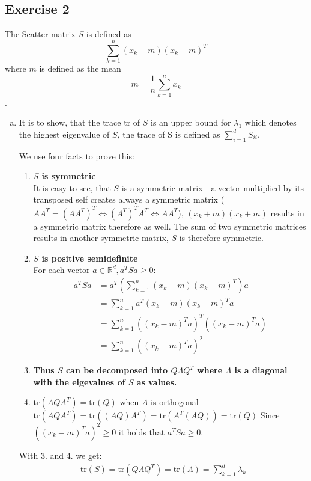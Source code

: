 \documentclass[10pt,a4paper]{article}
\newcommand{\tr}{\text{tr}}
\begin{document}
\subsection*{Exercise 2}
The Scatter-matrix $S$ is defined as $$\sum_{k = 1}^{n} (x_k - m)(x_k - m)^T$$ where $m$ is defined as the mean $$m = \frac{1}{n}\sum_{k=1}^{n}x_k$$. 
\begin{enumerate}[(a)]
\item
It is to show, that the trace $\tr$ of $S$ is an upper bound for $\lambda_1$ which denotes the highest eigenvalue of $S$, the trace of S is defined as $\sum^d_{i=1} S_{ii}$.

We use four facts to prove this:
\begin{enumerate}[1.]
    \item \textbf{$S$ is symmetric} \\
    It is easy to see, that $S$ is a symmetric matrix - a vector multiplied by its transposed self creates always a symmetric matrix ($AA^T = (AA^T)^T \Leftrightarrow (A^T)^TA^T \Leftrightarrow AA^T$), $(x_k + m)(x_k + m)$ results in a symmetric matrix therefore as well. The sum of two symmetric matrices results in another symmetric matrix, $S$ is therefore symmetric.
    \item \textbf{$S$ is positive semidefinite}\\
    For each vector $a \in \mathbb{R}^d, a^TSa \ge 0$:\\
    \begin{align*}
        a^TSa &= a^T(\sum_{k = 1}^{n} (x_k - m)(x_k - m)^T)a\\
        &= \sum_{k = 1}^{n} a^T(x_k - m)(x_k - m)^Ta\\
        &= \sum_{k = 1}^{n} ((x_k - m)^Ta)^T((x_k - m)^Ta)\\
        &= \sum_{k = 1}^{n} ((x_k - m)^Ta)^2
    \end{align*}
    \item \textbf{Thus $S$ can be decomposed into $Q\Lambda Q^T$ where $\Lambda$ is a diagonal with the eigevalues of $S$ as values.} %
    \item $\tr(AQA^T) = \tr(Q)$ when $A$ is orthogonal \\
    $\tr(AQA^T) = \tr((AQ)A^T) = \tr(A^T(AQ)) = \tr(Q)$
Since $((x_k - m)^Ta)^2 \ge 0$ it holds that $a^TSa \ge 0$.
\end{enumerate}
With 3. and 4. we get:
\begin{align*}
\tr(S) = \tr(Q\Lambda Q^T) = \tr(\Lambda) = \sum_{k = 1}^{d} \lambda_k

\end{align*}
\end{enumerate}
\end{document}
